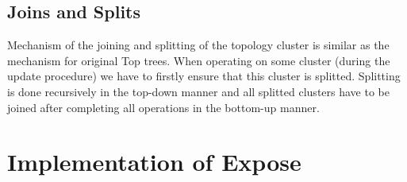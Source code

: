 \subsection{Joins and Splits}

Mechanism of the joining and splitting of the topology cluster is similar as the
mechanism for original Top trees. When operating on some cluster (during the
update procedure) we have to firstly ensure that this cluster is splitted.
Splitting is done recursively in the top-down manner and all splitted clusters
have to be joined after completing all operations in the bottom-up manner.

\section{Implementation of Expose}

